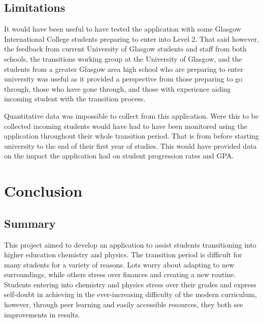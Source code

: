 \documentclass{l4proj}
\begin{document}
\section{Limitations}
It would have been useful to have tested the application with some Glasgow International College students preparing to enter into Level 2. That said however,  the feedback from current University of Glasgow students and staff from both schools,  the transitions working group at the University of Glasgow,  and the students from a greater Glasgow area high school who are preparing to enter university was useful as it provided a perspective from those preparing to go through,  those who have gone through,  and those with experience aiding incoming student with the transition process.

Quantitative data was impossible to collect from this application. Were this to be collected incoming students would have had to have been monitored using the application throughout their whole transition period. That is from before starting university to the end of their first year of studies. This would have provided data on the impact the application had on student progression rates and GPA.

\chapter{Conclusion}
\section{Summary}
This project aimed to develop an application to assist students transitioning into higher education chemistry and physics. The transition period is difficult for many students for a variety of reasons. Lots worry about adapting to new surroundings,  while others stress over finances and creating a new routine. Students entering into chemistry and physics stress over their grades and express self-doubt in achieving in the ever-increasing difficulty of the modern curriculum,  however,  through peer learning and easily accessible resources,  they both see improvements in results.
\end{document}
